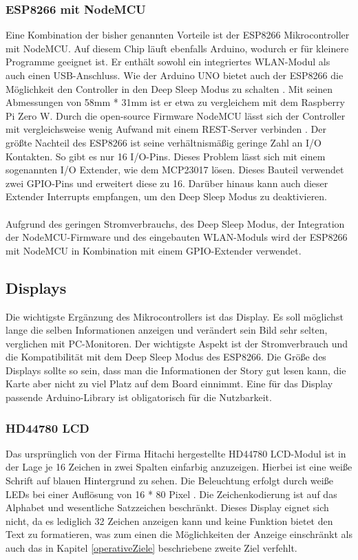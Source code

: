 \documentclass[12pt,titlepage]{scrartcl}
\begin{document}
			\subsubsection{ESP8266 mit NodeMCU} \label{esp8266}
			Eine Kombination der bisher genannten Vorteile ist der ESP8266 Mikrocontroller mit NodeMCU. Auf diesem Chip läuft ebenfalls Arduino, wodurch er für kleinere Programme geeignet ist. Er enthält sowohl ein integriertes WLAN-Modul als auch einen USB-Anschluss. Wie der Arduino UNO bietet auch der ESP8266 die Möglichkeit den Controller in den Deep Sleep Modus zu schalten \cite{esp8266general}. Mit seinen Abmessungen von 58mm * 31mm ist er etwa zu vergleichem mit dem Raspberry Pi Zero W. Durch die open-source Firmware NodeMCU lässt sich der Controller mit vergleichsweise wenig Aufwand mit einem REST-Server verbinden \cite{nodemcuexamples}. Der größte Nachteil des ESP8266 ist seine verhältnismäßig geringe Zahl an I/O Kontakten. So gibt es nur 16 I/O-Pins. Dieses Problem lässt sich mit einem sogenannten I/O Extender, wie dem MCP23017 lösen. Dieses Bauteil verwendet zwei GPIO-Pins und erweitert diese zu 16. Darüber hinaus kann auch dieser Extender Interrupts empfangen, um den Deep Sleep Modus zu deaktivieren. \\ \\
			Aufgrund des geringen Stromverbrauchs, des Deep Sleep Modus, der Integration der NodeMCU-Firmware und des eingebauten WLAN-Moduls wird der ESP8266 mit NodeMCU in Kombination mit einem GPIO-Extender verwendet.
		\subsection{Displays}
		Die wichtigste Ergänzung des Mikrocontrollers ist das Display. Es soll möglichst lange die selben Informationen anzeigen und verändert sein Bild sehr selten, verglichen mit PC-Monitoren. Der wichtigste Aspekt ist der Stromverbrauch und die Kompatibilität mit dem Deep Sleep Modus des ESP8266.  Die Größe des Displays sollte so sein, dass man die Informationen der Story gut lesen kann, die Karte aber nicht zu viel Platz auf dem Board einnimmt. Eine für das Display passende Arduino-Library ist obligatorisch für die Nutzbarkeit.
			\subsubsection{HD44780 LCD}
			Das ursprünglich von der Firma Hitachi hergestellte HD44780 LCD-Modul ist in der Lage je 16 Zeichen in zwei Spalten einfarbig anzuzeigen. Hierbei ist eine weiße Schrift auf blauen Hintergrund zu sehen. Die Beleuchtung erfolgt durch weiße LEDs bei einer Auflösung von 16 * 80 Pixel \cite{hd44780manual}. Die Zeichenkodierung ist auf das Alphabet und wesentliche Satzzeichen beschränkt. Dieses Display eignet sich nicht, da es lediglich 32 Zeichen anzeigen kann und keine Funktion bietet den Text zu formatieren, was zum einen die Möglichkeiten der Anzeige einschränkt als auch das in Kapitel \ref{operativeZiele} beschriebene zweite Ziel verfehlt.
\end{document}
